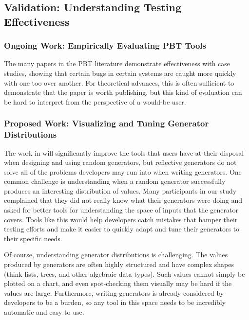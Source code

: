 \subsection{Validation: Understanding Testing Effectiveness }\label{sec:val}
\subsubsection{Ongoing Work: Empirically Evaluating PBT Tools}
The many papers in the PBT literature demonstrate effectiveness with case
studies, showing that certain bugs in certain systems are caught more quickly
with one too over another. For theoretical advances, this is often sufficient
to demonstrate that the paper is worth publishing, but this kind of evaluation
can be hard to interpret from the perspective of a would-be user. 


\subsubsection{Proposed Work: Visualizing and Tuning Generator Distributions}
\newcommand{\genvis}{GenVis}
The work in  will significantly improve the tools that
users have at their disposal when designing and using random generators, but
reflective generators do not solve all of the problems developers may run into
when writing generators. One common challenge is understanding when a random
generator successfully produces an interesting distribution of values. Many
participants in our study complained that they did not really know what their
generators were doing and asked for better tools for understanding the space of
inputs that the generator covers. Tools like this would help developers catch
mistakes that hamper their testing efforts and make it easier to quickly adapt
and tune their generators to their specific needs.

Of course, understanding generator distributions is challenging.  The values
produced by generators are often highly structured and have complex shapes
(think lists, trees, and other algebraic data types). Such values cannot simply
be plotted on a chart, and even spot-checking them visually may be hard if the
values are large.  Furthermore, writing generators is already considered by
developers to be a burden, so any tool in this space needs to be incredibly
automatic and easy to use.


